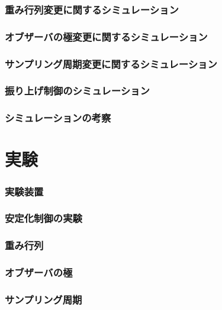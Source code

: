 \documentclass[a4j,11pt,twoside]{jbook}
\begin{document}
\subsection{重み行列変更に関するシミュレーション}

\subsection{オブザーバの極変更に関するシミュレーション}

\subsection{サンプリング周期変更に関するシミュレーション}

\subsection{振り上げ制御のシミュレーション}

\subsection{シミュレーションの考察}


\chapter{実験}

\subsection{実験装置}

\subsection{安定化制御の実験}

\subsection{重み行列}

\subsection{オブザーバの極}

\subsection{サンプリング周期}
\end{document}
